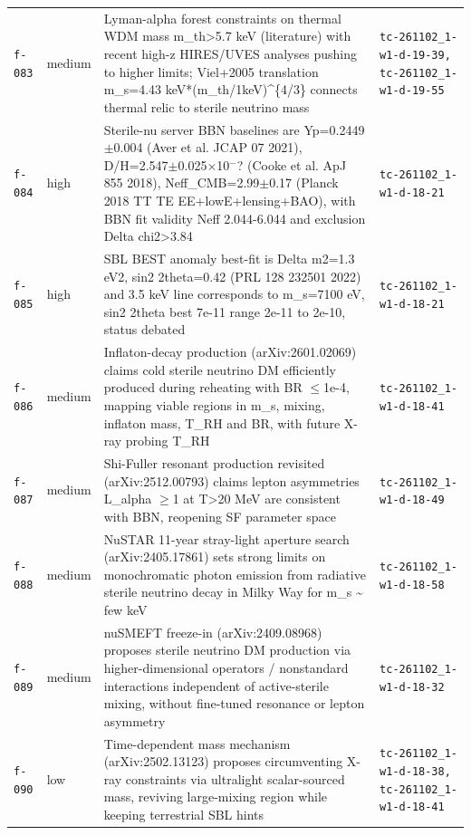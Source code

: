 \documentclass[11pt,a4paper]{article}
\begin{document}
\begin{longtable}{@{}p{}p{}p{}p{}@{}}
\texttt{f-083} & medium & Lyman-alpha forest constraints on thermal WDM mass m\_th\textgreater{}5.7 keV (literature) with recent high-z HIRES/UVES analyses pushing to higher limits; Viel+2005 translation m\_s=4.43 keV*(m\_th/1keV)\textasciicircum{}\{4/3\} connects thermal relic to sterile neutrino mass & \texttt{tc-261102\_\allowbreak{}1-w1-d-19-39,\allowbreak{} tc-261102\_\allowbreak{}1-w1-d-19-55} \\
\texttt{f-084} & high & Sterile-nu server BBN baselines are Yp=0.2449$\pm$0.004 (Aver et al. JCAP 07 2021), D/H=2.547$\pm$0.025$\times$10$^-$? (Cooke et al. ApJ 855 2018), Neff\_CMB=2.99$\pm$0.17 (Planck 2018 TT TE EE+lowE+lensing+BAO), with BBN fit validity Neff 2.044-6.044 and exclusion Delta chi2\textgreater{}3.84 & \texttt{tc-261102\_\allowbreak{}1-w1-d-18-21} \\
\texttt{f-085} & high & SBL BEST anomaly best-fit is Delta m2=1.3 eV2, sin2 2theta=0.42 (PRL 128 232501 2022) and 3.5 keV line corresponds to m\_s=7100 eV, sin2 2theta best 7e-11 range 2e-11 to 2e-10, status debated & \texttt{tc-261102\_\allowbreak{}1-w1-d-18-21} \\
\texttt{f-086} & medium & Inflaton-decay production (arXiv:2601.02069) claims cold sterile neutrino DM efficiently produced during reheating with BR $\leq$1e-4, mapping viable regions in m\_s, mixing, inflaton mass, T\_RH and BR, with future X-ray probing T\_RH & \texttt{tc-261102\_\allowbreak{}1-w1-d-18-41} \\
\texttt{f-087} & medium & Shi-Fuller resonant production revisited (arXiv:2512.00793) claims lepton asymmetries L\_alpha $\geq$1 at T\textgreater{}20 MeV are consistent with BBN, reopening SF parameter space & \texttt{tc-261102\_\allowbreak{}1-w1-d-18-49} \\
\texttt{f-088} & medium & NuSTAR 11-year stray-light aperture search (arXiv:2405.17861) sets strong limits on monochromatic photon emission from radiative sterile neutrino decay in Milky Way for m\_s \textasciitilde{} few keV & \texttt{tc-261102\_\allowbreak{}1-w1-d-18-58} \\
\texttt{f-089} & medium & nuSMEFT freeze-in (arXiv:2409.08968) proposes sterile neutrino DM production via higher-dimensional operators / nonstandard interactions independent of active-sterile mixing, without fine-tuned resonance or lepton asymmetry & \texttt{tc-261102\_\allowbreak{}1-w1-d-18-32} \\
\texttt{f-090} & low & Time-dependent mass mechanism (arXiv:2502.13123) proposes circumventing X-ray constraints via ultralight scalar-sourced mass, reviving large-mixing region while keeping terrestrial SBL hints & \texttt{tc-261102\_\allowbreak{}1-w1-d-18-38,\allowbreak{} tc-261102\_\allowbreak{}1-w1-d-18-41} \\

\end{longtable}
\end{document}
